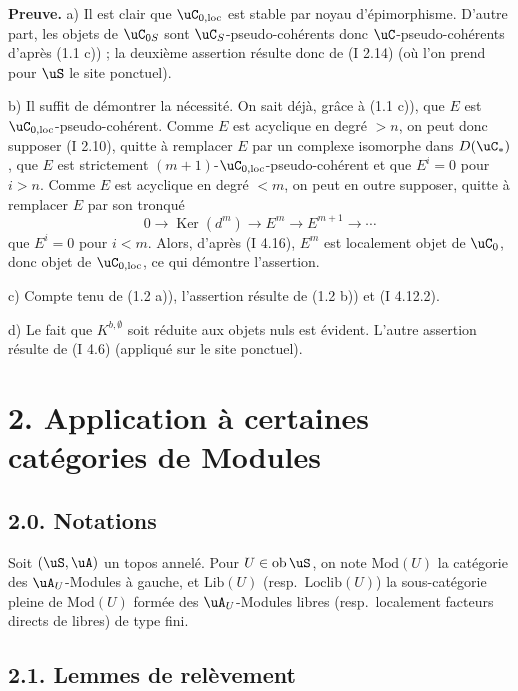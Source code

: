 \noindent\textbf{Preuve.} a) Il est clair que $\uC_{0,\mathrm{loc}}$ est stable par noyau d'\'{e}pimorphisme. D'autre part, les objets de $\uC_{0S}$ sont $\uC_S$-pseudo-coh\'{e}rents donc $\uC$-pseudo-coh\'{e}rents d'apr\`{e}s (1.1 c)) ; la deuxi\`{e}me assertion r\'{e}sulte donc de (I 2.14) (o\`{u} l'on prend pour $\uS$ le site ponctuel).

b) Il suffit de d\'{e}montrer la n\'{e}cessit\'{e}. On sait d\'{e}j\`{a}, gr\^{a}ce \`{a} (1.1 c)), que $E$ est $\uC_{0,\mathrm{loc}}$-pseudo-coh\'{e}rent. Comme $E$ est acyclique en degr\'{e} $> n$, on peut donc supposer (I 2.10), quitte \`{a} remplacer $E$ par un complexe isomorphe dans $D(\uC_*)$, que $E$ est strictement $(m+1)$-$\uC_{0,\mathrm{loc}}$-pseudo-coh\'{e}rent et que $E^i = 0$ pour $i > n$. Comme $E$ est acyclique en degr\'{e} $< m$, on peut en outre supposer, quitte \`{a} remplacer $E$ par son tronqu\'{e}
\[
0 \longrightarrow \operatorname{Ker}(d^m) \longrightarrow E^m \longrightarrow E^{m+1} \longrightarrow \cdots
\]
que $E^i = 0$ pour $i < m$. Alors, d'apr\`{e}s (I 4.16), $E^m$ est localement objet de $\uC_0$, donc objet de $\uC_{0,\mathrm{loc}}$, ce qui d\'{e}montre l'assertion.

c) Compte tenu de (1.2 a)), l'assertion r\'{e}sulte de (1.2 b)) et (I 4.12.2).

d) Le fait que $K^{b,\emptyset}$ soit r\'{e}duite aux objets nuls est \'{e}vident. L'autre assertion r\'{e}sulte de (I 4.6) (appliqu\'{e} sur le site ponctuel).

\section*{2. Application \`{a} certaines cat\'{e}gories de Modules}

\subsection*{2.0. Notations}

Soit $(\uS,\uA)$ un topos annel\'{e}. Pour $U \in \operatorname{ob} \uS$, on note $\mathrm{Mod}(U)$ la cat\'{e}gorie des $\uA_U$-Modules \`{a} gauche, et $\mathrm{Lib}(U)$ (resp.~$\mathrm{Loclib}(U)$) la sous-cat\'{e}gorie pleine de $\mathrm{Mod}(U)$ form\'{e}e des $\uA_U$-Modules libres (resp.~localement facteurs directs de libres) de type fini.

\subsection*{2.1. Lemmes de rel\`{e}vement}

